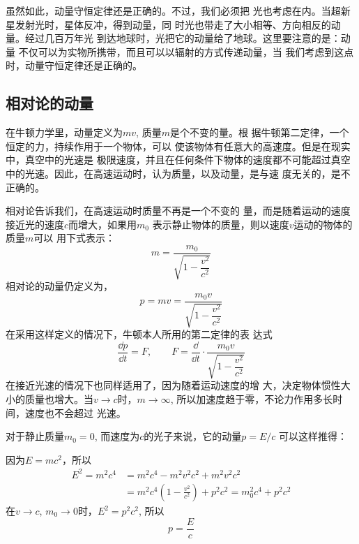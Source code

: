 虽然如此，动量守恒定律还是正确的。不过，我们必须把
光也考虑在内。当超新星发射光时，星体反冲，得到动量，同
时光也带走了大小相等、方向相反的动量。经过几百万年光
到达地球时，光把它的动量给了地球。这里要注意的是：动量
不仅可以为实物所携带，而且可以以辐射的方式传递动量，当
我们考虑到这点时，动量守恒定律还是正确的。

\subsection{相对论的动量}

在牛顿力学里，动量定义为$mv$, 质量$m$是个不变的量。根
据牛顿第二定律，一个恒定的力，持续作用于一个物体，可以
使该物体有任意大的高速度。但是在现实中，真空中的光速是
极限速度，并且在任何条件下物体的速度都不可能超过真空
中的光速。因此，在高速运动时，认为质量，以及动量，是与速
度无关的，是不正确的。

相对论告诉我们，在高速运动时质量不再是一个不变的
量，而是随着运动的速度接近光的速度$c$而增大，如果用$m_0$
表示静止物体的质量，则以速度$v$运动的物体的质量$m$可以
用下式表示：
\[m=\frac{m_0}{\sqrt{1-\dfrac{v^2}{c^2}}}\]
相对论的动量仍定义为，
\[p=mv=\frac{m_0v}{\sqrt{1-\dfrac{v^2}{c^2}}}\]
在采用这样定义的情况下，牛顿本人所用的第二定律的表
达式
\[\frac{\dd p}{\dd t}=F,\qquad F=\frac{\dd}{\dd t}\cdot\frac{m_0v}{\sqrt{1-\dfrac{v^2}{c^2}}}\]
在接近光速的情况下也同样适用了，因为随着运动速度的增
大，决定物体惯性大小的质量也增大。当$v\to c$时，$m\to \infty$, 所以加速度趋于零，不论力作用多长时间，速度也不会超过
光速。

对于静止质量$m_0=0$, 而速度为$c$的光子来说，它的动量$p=E/c$
可以这样推得：

因为$E=mc^2$，所以
\[\begin{split}
    E^2=m^2c^4&=m^2c^4-m^2v^2c^2+m^2v^2c^2\\
    &=m^2c^4\left(1-\frac{v^2}{c^2}\right)+p^2c^2=m^2_0c^4+p^2c^2
\end{split}\]
在$v\to c$, $m_0\to 0$时，$E^2=p^2c^2$, 所以
\[p=\frac{E}{c}\]


